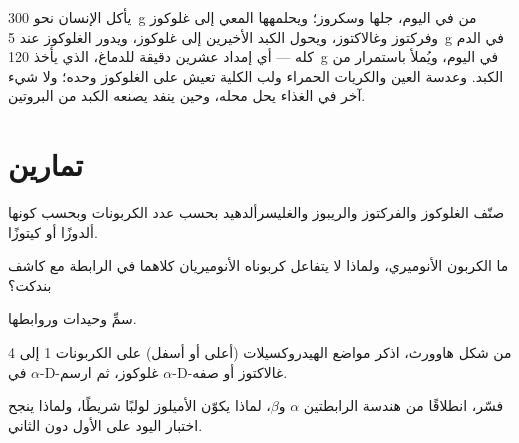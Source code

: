 \begin{example}\label{ex:b1:carbohydrates:day}
يأكل الإنسان نحو \qty{300}{g} من  في اليوم، جلها 
وسكروز؛ ويحلمهها المعي إلى غلوكوز وفركتوز وغالاكتوز، ويحول الكبد
الأخيرين إلى غلوكوز، ويدور الغلوكوز عند \qty{5}{g} في الدم كله ---
أي إمداد عشرين دقيقة للدماغ، الذي يأخذ \qty{120}{g} في اليوم، ويُملأ
باستمرار من  الكبد. وعدسة العين والكريات الحمراء ولب الكلية
تعيش على الغلوكوز وحده؛ ولا شيء آخر في الغذاء يحل محله، وحين ينفد
يصنعه الكبد من البروتين.
\end{example}

\section{تمارين}

\begin{exercise}[$\star$]\label{exo:b1:carbohydrates:1}
صنّف الغلوكوز والفركتوز والريبوز والغليسرألدهيد بحسب عدد الكربونات
وبحسب كونها ألدوزًا أو كيتوزًا.
\end{exercise}

\begin{exercise}[$\star$]\label{exo:b1:carbohydrates:2}
ما الكربون الأنوميري، ولماذا لا يتفاعل  كربوناه
الأنوميريان كلاهما في الرابطة مع كاشف بندكت؟
\end{exercise}

\begin{exercise}[$\star$]\label{exo:b1:carbohydrates:3}
سمِّ وحيدات     وروابطها.
\end{exercise}

\begin{exercise}[$\star$]\label{exo:b1:carbohydrates:4}
من شكل هاوورث، اذكر مواضع الهيدروكسيلات (أعلى أو أسفل) على الكربونات
1 إلى 4 في $\alpha$-D-غلوكوز، ثم ارسم $\alpha$-D-غالاكتوز أو صفه.
\end{exercise}

\begin{exercise}[$\star\star$]\label{exo:b1:carbohydrates:5}
فسّر، انطلاقًا من هندسة الرابطتين $\alpha$ و$\beta$، لماذا يكوّن
الأميلوز لولبًا  شريطًا، ولماذا ينجح اختبار اليود على
الأول دون الثاني.
\end{exercise}

